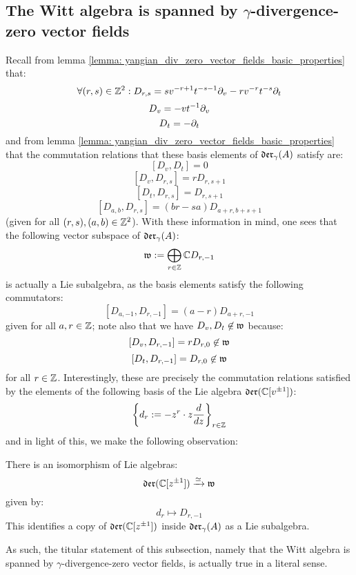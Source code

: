     \subsection{The Witt algebra is spanned by \texorpdfstring{$\gamma$}{}-divergence-zero vector fields}
        Recall from lemma \ref{lemma: yangian_div_zero_vector_fields_basic_properties} that:
            $$\forall (r, s) \in \mathbb{Z}^2: D_{r, s} = s v^{-r + 1} t^{-s - 1} \partial_v - r v^{-r} t^{-s} \partial_t$$
            $$D_v = -v t^{-1} \partial_v$$
            $$D_t = -\partial_t$$
        and from lemma \ref{lemma: yangian_div_zero_vector_fields_basic_properties} that the commutation relations that these basis elements of $\mathfrak{der}_{\gamma}(A)$ satisfy are:
            $$[D_v, D_t] = 0$$
            $$[D_v, D_{r, s}] = r D_{r, s + 1}$$
            $$[D_t, D_{r, s}] = D_{r, s + 1}$$
            $$[D_{a, b}, D_{r, s}] = (br - sa) D_{a + r, b + s + 1}$$
        (given for all $(r, s), (a, b) \in \mathbb{Z}^2$). With these information in mind, one sees that the following vector subspace of $\mathfrak{der}_{\gamma}(A)$:
            $$\mathfrak{w} := \bigoplus_{r \in \mathbb{Z}} \mathbb{C} D_{r, -1}$$
        is actually a Lie subalgebra, as the basis elements satisfy the following commutators:
            $$[D_{a, -1}, D_{r, -1}] = (a - r) D_{a + r, -1}$$
        given for all $a, r \in \mathbb{Z}$; note also that we have $D_v, D_t \not \in \mathfrak{w}$ because:
            $$[D_v, D_{r, -1}] = r D_{r, 0} \not \in \mathfrak{w}$$
            $$[D_t, D_{r, -1}] = D_{r, 0} \not \in \mathfrak{w}$$    
        for all $r \in \mathbb{Z}$. Interestingly, these are precisely the commutation relations satisfied by the elements of the following basis of the Lie algebra $\mathfrak{der}(\mathbb{C}[v^{\pm 1}])$:
            $$\left\{ d_r := -z^r \cdot z \frac{d}{dz} \right\}_{r \in \mathbb{Z}}$$
        and in light of this, we make the following observation:
        \begin{proposition} \label{prop: a_copy_of_the_witt_algebra_inside_the_lie_algebra_of_yangian_div_zero_vector_fields}
            There is an isomorphism of Lie algebras:
                $$\mathfrak{der}(\mathbb{C}[z^{\pm 1}]) \xrightarrow[]{\simeq} \mathfrak{w}$$
            given by:
                $$d_r \mapsto D_{r, -1}$$
            This identifies a copy of $\mathfrak{der}(\mathbb{C}[z^{\pm 1}])$ inside $\mathfrak{der}_{\gamma}(A)$ as a Lie subalgebra. 
        \end{proposition}

        As such, the titular statement of this subsection, namely that the Witt algebra is spanned by \texorpdfstring{$\gamma$}{}-divergence-zero vector fields, is actually true in a literal sense.